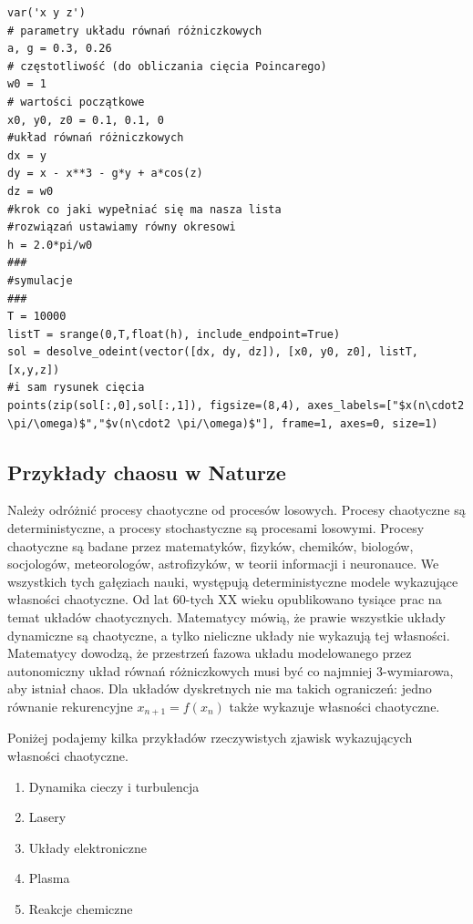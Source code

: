 \documentclass[a4paper,12pt,polish]{sphinxmanual}
\begin{document}
\begin{verbatim}
var('x y z')
# parametry układu równań różniczkowych
a, g = 0.3, 0.26
# częstotliwość (do obliczania cięcia Poincarego)
w0 = 1
# wartości początkowe
x0, y0, z0 = 0.1, 0.1, 0
#układ równań różniczkowych
dx = y
dy = x - x**3 - g*y + a*cos(z)
dz = w0
#krok co jaki wypełniać się ma nasza lista
#rozwiązań ustawiamy równy okresowi
h = 2.0*pi/w0
###
#symulacje
###
T = 10000
listT = srange(0,T,float(h), include_endpoint=True)
sol = desolve_odeint(vector([dx, dy, dz]), [x0, y0, z0], listT, [x,y,z])
#i sam rysunek cięcia
points(zip(sol[:,0],sol[:,1]), figsize=(8,4), axes_labels=["$x(n\cdot2 \pi/\omega)$","$v(n\cdot2 \pi/\omega)$"], frame=1, axes=0, size=1)
\end{verbatim}



\subsection{Przykłady chaosu w Naturze}
\label{ch2/chII012:przyklady-chaosu-w-naturze}
Należy odróżnić procesy  chaotyczne  od procesów losowych. Procesy chaotyczne są deterministyczne, a procesy stochastyczne są procesami losowymi.  Procesy chaotyczne są badane przez matematyków, fizyków, chemików, biologów, socjologów, meteorologów, astrofizyków, w teorii informacji i neuronauce. We wszystkich tych gałęziach nauki, występują  deterministyczne modele wykazujące własności chaotyczne. Od lat 60-tych XX wieku opublikowano tysiące prac na temat układów chaotycznych.  Matematycy mówią, że prawie wszystkie układy dynamiczne są chaotyczne, a tylko nieliczne układy nie wykazują tej własności. Matematycy dowodzą, że przestrzeń fazowa układu modelowanego przez autonomiczny układ równań różniczkowych musi być co najmniej 3-wymiarowa, aby istniał chaos. Dla układów dyskretnych nie ma takich ograniczeń: jedno równanie  rekurencyjne $x_{n+1} = f(x_n)$  także wykazuje własności chaotyczne.

Poniżej podajemy kilka przykładów rzeczywistych zjawisk wykazujących własności chaotyczne.
\begin{enumerate}
\item {} 
Dynamika cieczy i turbulencja

\item {} 
Lasery

\item {} 
Układy elektroniczne

\item {} 
Plasma

\item {} 
Reakcje chemiczne

\end{enumerate}
\end{document}

